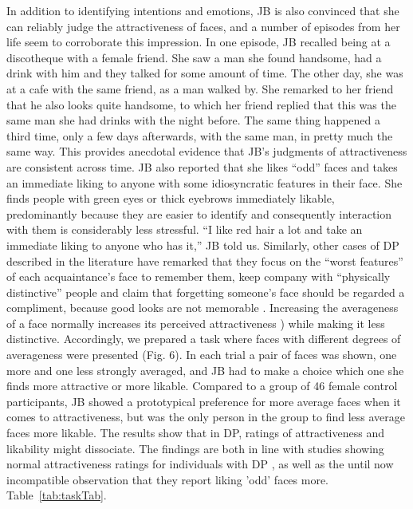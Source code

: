 \documentclass[fleqn,10pt]{SelfArx} %
\begin{document}
In addition to identifying intentions and emotions, JB is also convinced that she can reliably judge the attractiveness of faces, and a number of episodes from her life seem to corroborate this impression.
In one episode, JB recalled being at a discotheque with a female friend. She saw a man she found handsome, had a drink with him and they talked for some amount of time. The other day, she was at a cafe with the same friend, as a man walked by. She remarked to her friend that he also looks quite handsome, to which her friend replied that this was the same man she had drinks with the night before. The same thing happened a third time, only a few days afterwards, with the same man, in pretty much the same way. This provides anecdotal evidence that JB's judgments of attractiveness are consistent across time.
JB also reported that she likes “odd” faces and takes an immediate liking to anyone with some idiosyncratic features in their face. She finds people with green eyes or thick eyebrows immediately likable, predominantly because they are easier to identify and consequently interaction with them is considerably less stressful. “I like red hair a lot and take an immediate liking to anyone who has it,” JB told us. Similarly, other cases of DP described in the literature have remarked that they focus on the “worst features” of each acquaintance's face to remember them, keep company with “physically distinctive” people and claim that forgetting someone's face should be regarded a compliment, because good looks are not memorable \citep{Fine_2012}.
Increasing the averageness of a face normally increases its perceived attractiveness \citep{Little_2011}) while making it less distinctive. Accordingly, we prepared a task where faces with different degrees of averageness were presented (Fig. 6). In each trial a pair of faces was shown, one more and one less strongly averaged, and JB had to make a choice which one she finds more attractive or more likable. Compared to a group of 46 female control participants, JB showed a prototypical preference for more average faces when it comes to attractiveness, but was the only person in the group to find less average faces more likable. The results show that in DP, ratings of attractiveness and likability might dissociate. The findings are both in line with studies showing normal attractiveness ratings for individuals with DP \citep{Carbon_2010}, as well as the until now incompatible observation that they report liking 'odd' faces more.
Table~\ref{tab:taskTab}.
\end{document}
